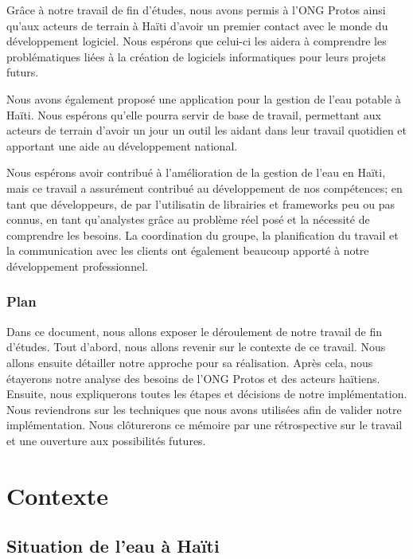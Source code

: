 \documentclass{eplmastersthesis_FR}
\begin{document}
			Grâce à notre travail de fin d'études, nous avons permis à l'ONG Protos ainsi qu'aux acteurs de terrain à Haïti d'avoir un premier contact avec le monde du développement logiciel. Nous espérons que celui-ci les aidera à comprendre les problématiques liées à la création de logiciels informatiques pour leurs projets futurs.

			Nous avons également proposé une application pour la gestion de l'eau potable à Haïti. Nous espérons qu'elle pourra servir de base de travail, permettant aux acteurs de terrain d'avoir un jour un outil les aidant dans leur travail quotidien et apportant une aide au développement national.

			Nous espérons avoir contribué à l'amélioration de la gestion de l'eau en Haïti, mais ce travail a assurément contribué au développement de nos compétences; en tant que développeurs, de par l'utilisatin de librairies et frameworks peu ou pas connus, en tant qu'analystes grâce au problème réel posé et la nécessité de comprendre les besoins. La coordination du groupe, la planification du travail et la communication avec les clients ont également beaucoup apporté à notre développement professionnel.

		\subsection*{Plan}

			Dans ce document, nous allons exposer le déroulement de notre travail de fin d'études. Tout d'abord, nous allons revenir sur le contexte de ce travail. Nous allons ensuite détailler notre approche pour sa réalisation. Après cela, nous étayerons notre analyse des besoins de l'ONG Protos et des acteurs haïtiens. Ensuite, nous expliquerons toutes les étapes et décisions de notre implémentation. Nous reviendrons sur les techniques que nous avons utilisées afin de valider notre implémentation. Nous clôturerons ce mémoire par une rétrospective sur le travail et une ouverture aux possibilités futures.

	\chapter{Contexte}


		\section{Situation de l'eau à Haïti}
\end{document}
